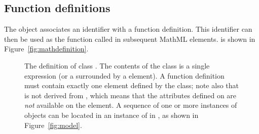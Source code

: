 \subsection{Function definitions}
\label{sec:functiondefinition}

The \FunctionDefinition object associates an identifier with a
function definition.  This identifier can then be used as the
function called in subsequent MathML  elements.
\FunctionDefinition is shown in Figure~\vref{fig:mathdefinition}.

\begin{figure}[htb]
  \centering
  \small
  \caption{The definition of class \FunctionDefinition.
      The contents of the  class is a single \mathml
       expression (or a  surrounded by
      a  element).  A function definition must
      contain exactly one  element defined by the
       class; note also that  is not
      derived from \SBase, which means that the attributes defined
      on \SBase are \emph{not} available on the 
      element.  A sequence of one or more instances of
      \FunctionDefinition objects can be located in an instance of
      \ListOfFunctionDefinitions in \Model, as shown in
      Figure~\protect\ref{fig:model}.}
  \label{fig:mathdefinition}
  \label{fig:functionDefinition}
\end{figure}

